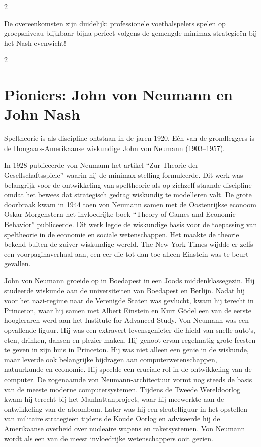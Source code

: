 \begin{multicols}{2}

De overeenkomsten zijn duidelijk: professionele voetbalspelers spelen op groepsniveau blijkbaar bijna perfect volgens de gemengde minimax-strategieën bij het Nash-evenwicht!
\end{multicols}

\clearpage
\begin{multicols}{2}
\section{Pioniers: John von Neumann en John Nash}\label{sec:pioniers}

Speltheorie is als discipline ontstaan in de jaren 1920. Eén van de grondleggers is de Hongaars-Amerikaanse wiskundige John von Neumann (1903–1957).


In 1928 publiceerde von Neumann het artikel ``Zur Theorie der Gesellschaftsspiele'' waarin hij de minimax-stelling formuleerde. Dit werk was belangrijk voor de ontwikkeling van speltheorie als op zichzelf staande discipline omdat het bewees dat strategisch gedrag wiskundig te modelleren valt. De grote doorbraak kwam in 1944 toen von Neumann samen met de Oostenrijkse econoom Oskar Morgenstern het invloedrijke boek ``Theory of Games and Economic Behavior'' publiceerde. Dit werk legde de wiskundige basis voor de toepassing van speltheorie in de economie en sociale wetenschappen. Het maakte de theorie bekend buiten de zuiver wiskundige wereld. The New York Times wijdde er zelfs een voorpaginaverhaal aan, een eer die tot dan toe alleen Einstein was te beurt gevallen.

John von Neumann groeide op in Boedapest in een Joods middenklassegezin. Hij studeerde wiskunde aan de universiteiten van Boedapest en Berlijn. Nadat hij voor het nazi-regime naar de Verenigde Staten was gevlucht, kwam hij terecht in Princeton, waar hij samen met Albert Einstein en Kurt Gödel een van de eerste hoogleraren werd aan het Institute for Advanced Study. Von Neumann was een opvallende figuur. Hij was een extravert levensgenieter die hield van snelle auto's, eten, drinken, dansen en plezier maken. Hij genoot ervan regelmatig grote feesten te geven in zijn huis in Princeton. Hij was niet alleen een genie in de wiskunde, maar leverde ook belangrijke bijdragen aan computerwetenschappen, natuurkunde en economie. Hij speelde een cruciale rol in de ontwikkeling van de computer. De zogenaamde von Neumann-architectuur vormt nog steeds de basis van de meeste moderne computersystemen. Tijdens de Tweede Wereldoorlog kwam hij terecht bij het Manhattanproject, waar hij meewerkte aan de ontwikkeling van de atoombom. Later was hij een sleutelfiguur in het opstellen van militaire strategieën tijdens de Koude Oorlog en adviseerde hij de Amerikaanse overheid over nucleaire wapens en raketsystemen. Von Neumann wordt als een van de meest invloedrijke wetenschappers ooit gezien.


\end{multicols}
